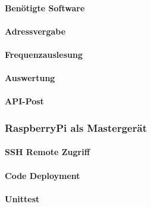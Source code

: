 \paragraph{Benötigte Software}
\paragraph{Adressvergabe}
\paragraph{Frequenzauslesung}

\paragraph{Auswertung}
\paragraph{API-Post}

\subsubsection{RaspberryPi als Mastergerät}
\paragraph{SSH Remote Zugriff}
\paragraph{Code Deployment}
\paragraph{Unittest}

\pagebreak


